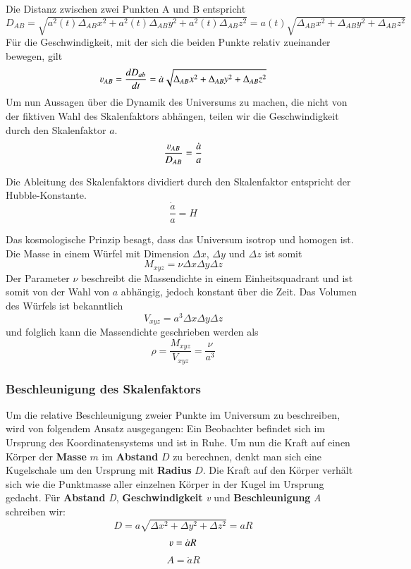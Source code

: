 \begin{refsection}
Die Distanz zwischen zwei Punkten A und B entspricht 
\begin{equation}
D_{AB} = \sqrt{a^2(t)\Delta_{AB}x^2 + a^2(t)\Delta_{AB}y^2 + a^2(t)\Delta_{AB}z^2} = a(t) \sqrt{\Delta_{AB}x^2 + \Delta_{AB}y^2 + \Delta_{AB}z^2}
\end{equation}
F\"{u}r die Geschwindigkeit, mit der sich die beiden Punkte relativ zueinander bewegen, gilt 
\begin{equation}
\varv_{AB} = \dfrac{dD_{ab}}{dt} 
	   = \dot{a} \sqrt{\Delta_{AB}x^2 + \Delta_{AB}y^2 + \Delta_{AB}z^2}
\end{equation}
Um nun Aussagen über die Dynamik des Universums zu machen, die nicht von der fiktiven Wahl  des Skalenfaktors abhängen, teilen wir die Geschwindigkeit durch den Skalenfaktor $a$.
\begin{equation}
\frac{\varv_{AB} }{D_{AB}} = \frac{\dot{a}}{a}
\label{friedmann:geschwindigkeit}
\end{equation}
\begin{satz} 
	Die Ableitung des Skalenfaktors dividiert durch den Skalenfaktor entspricht der Hubble-Konstante.
	\[
	\frac{\dot{a}}{a} = H
	\]
\end{satz}
Das kosmologische Prinzip besagt, dass das Universum isotrop und homogen ist. Die Masse in einem Würfel mit Dimension $\Delta x$, $\Delta y$ und $\Delta z$ ist somit
\begin{equation}
M_{xyz} = \nu \Delta x \Delta y \Delta z
\end{equation}
Der Parameter $\nu$ beschreibt die Massendichte in einem Einheitsquadrant und ist somit von der Wahl von $a$ abhängig, jedoch konstant über die Zeit. Das Volumen des Würfels ist bekanntlich 
\begin{equation}
V_{xyz} = a^3 \Delta x \Delta y \Delta z
\end{equation}
und folglich kann die Massendichte geschrieben werden als
\begin{equation}
\rho = \frac{M_{xyz}}{V_{xyz}} = \frac{\nu}{a^3}
\label{friedmann:dichte}
\end{equation}
\subsubsection{Beschleunigung des Skalenfaktors}
Um die relative Beschleunigung zweier Punkte im Universum zu beschreiben, wird von folgendem Ansatz ausgegangen: Ein Beobachter befindet sich im Ursprung des Koordinatensystems und ist in Ruhe. Um nun die Kraft auf einen Körper der \textbf{Masse} $m$ im \textbf{Abstand} $D$ zu berechnen, denkt man sich eine Kugelschale um den Ursprung mit \textbf{Radius} $D$. Die Kraft auf den Körper verhält sich wie die Punktmasse aller  einzelnen Körper in der Kugel im Ursprung gedacht.
Für \textbf{Abstand} \textit{D}, \textbf{Geschwindigkeit} \textit{v} und \textbf{Beschleunigung} \textit{A} schreiben wir:
\[D =  a \sqrt{\Delta x^2 + \Delta y^2 + \Delta z^2}  = a R\]
\[\varv = \dot{a} R\]
\[A = \ddot{a} R\]


\end{refsection}
